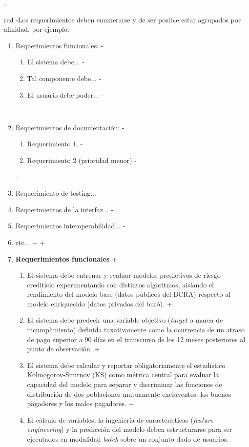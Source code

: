 \documentclass[
 11pt, %
-%
+codirector, %
 ]{charter}
\begin{document}
\begin{table}[ht]
\begin{table}[ht]
-\begin{consigna}{red} %
-Los requerimientos deben enumerarse y de ser posible estar agrupados por afinidad, por ejemplo:
-
 \begin{enumerate}
-	\item Requerimientos funcionales:
-		\begin{enumerate}
-			\item El sistema debe...
-			\item Tal componente debe...
-			\item El usuario debe poder...
-		\end{enumerate}
-	\item Requerimientos de documentación:
-		\begin{enumerate}
-			\item Requerimiento 1.
-			\item Requerimiento 2 (prioridad menor)
-		\end{enumerate}
-	\item Requerimiento de testing...
-	\item Requerimientos de la interfaz...
-	\item Requerimientos interoperabilidad...
-	\item etc...
+
+    \item \textbf{Requerimientos funcionales}
+    \begin{enumerate}
+        \item El sistema debe entrenar y evaluar modelos predictivos de riesgo crediticio experimentando con distintos algoritmos, aislando el rendimiento del modelo base (datos públicos del BCRA) respecto al modelo enriquecido (datos privados del buró).
+        \item El sistema debe predecir una variable objetivo (\textit{target} o marca de incumplimiento) definida taxativamente como la ocurrencia de un atraso de pago superior a 90 días en el transcurso de los 12 meses posteriores al punto de observación.
+        \item El sistema debe calcular y reportar obligatoriamente el estadístico Kolmogorov-Smirnov (KS) como métrica central para evaluar la capacidad del modelo para separar y discriminar las funciones de distribución de dos poblaciones mutuamente excluyentes: los buenos pagadores y los malos pagadores.
+        \item El cálculo de variables, la ingeniería de características (\textit{feature engineering}) y la predicción del modelo deben estructurarse para ser ejecutados en modalidad \textit{batch} sobre un conjunto dado de usuarios.

\end{enumerate}
\end{enumerate}
\end{consigna}
\end{table}
\end{table}
\end{document}
